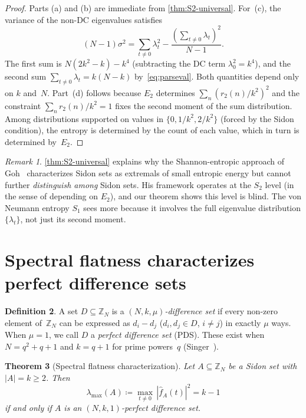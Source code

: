 \documentclass[11pt]{article}
\newtheorem{theorem}{Theorem}[section]
\theoremstyle{definition}
\newtheorem{definition}[theorem]{Definition}
\theoremstyle{remark}
\newtheorem{remark}[theorem]{Remark}
\newcommand{\Z}{\mathbb{Z}}
\newcommand{\fhat}{\widehat{f}}
\newcommand{\lmax}{\lambda_{\max}}
\begin{document}
\begin{proof}
Parts (a) and (b) are immediate from \cref{thm:S2-universal}.
For~(c), the variance of the non-DC eigenvalues satisfies
\[
  (N-1)\sigma^2 = \sum_{t \ne 0} \lambda_t^2
  - \frac{(\sum_{t \ne 0} \lambda_t)^2}{N-1}.
\]
The first sum is $N(2k^2-k) - k^4$ (subtracting the DC term
$\lambda_0^2 = k^4$), and the second sum $\sum_{t \ne 0}\lambda_t = k(N-k)$
by~\eqref{eq:parseval}.  Both quantities depend only on $k$
and~$N$.
Part~(d) follows because $E_2$ determines
$\sum_n (r_2(n)/k^2)^2$ and the constraint
$\sum_n r_2(n)/k^2 = 1$ fixes the second moment of the sum
distribution.  Among distributions supported on values in
$\{0, 1/k^2, 2/k^2\}$ (forced by the Sidon condition), the
entropy is determined by the count of each value, which in turn
is determined by~$E_2$.
\end{proof}

\begin{remark}
\cref{thm:S2-universal} explains why the Shannon-entropic approach
of Goh~\cite{Goh2024} characterizes Sidon sets as extremals of small
entropic energy but cannot further \emph{distinguish among} Sidon
sets.  His framework operates at the $S_2$ level (in the sense of
depending on $E_2$), and our theorem shows this level is blind.
The von Neumann entropy $S_1$ sees more because it involves the
full eigenvalue distribution $\{\lambda_t\}$, not just its second
moment.
\end{remark}

\section{Spectral flatness characterizes perfect difference sets}
\label{sec:flatness}

\begin{definition}
A set $D \subseteq \Z_N$ is a
\emph{$(N, k, \mu)$-difference set} if every non-zero element
of~$\Z_N$ can be expressed as $d_i - d_j$ ($d_i, d_j \in D$,
$i \ne j$) in exactly $\mu$ ways.  When $\mu = 1$, we call $D$
a \emph{perfect difference set} (PDS).  These exist when
$N = q^2 + q + 1$ and $k = q + 1$ for prime powers~$q$
(Singer~\cite{Singer1938}).
\end{definition}

\begin{theorem}[Spectral flatness characterization]
\label{thm:flatness}
Let $A \subseteq \Z_N$ be a Sidon set with $|A| = k \ge 2$.  Then
\[
  \lmax(A) \coloneqq \max_{t \ne 0}\, |\fhat_A(t)|^2 = k - 1
\]
if and only if $A$ is an $(N, k, 1)$-perfect difference set.
\end{theorem}
\end{document}
